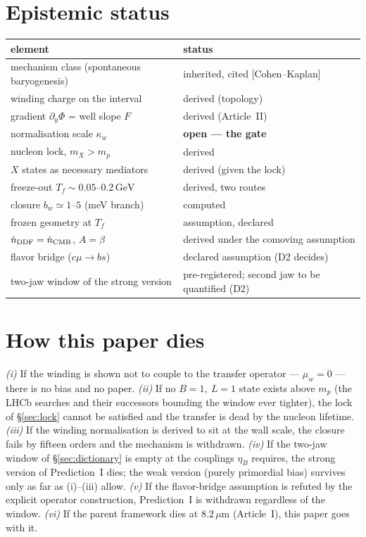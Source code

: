 \documentclass[11pt,a4paper]{article}
\newcommand{\GeV}{\,\mathrm{GeV}}
\begin{document}
\section{Epistemic status}
\label{sec:status}

\begin{center}\small
\begin{tabular}{p{7.2cm}p{6.4cm}}
\toprule
element & status \\
\midrule
mechanism class (spontaneous baryogenesis) & inherited, cited
[Cohen--Kaplan] \\
winding charge on the interval & derived (topology) \\
gradient $\partial_y\Phi$ = well slope $F$ & derived (Article~II) \\
normalisation scale $\kappa_w$ & \textbf{open --- the gate} \\
nucleon lock, $m_X>m_p$ & derived \\
$X$ states as necessary mediators & derived (given the lock) \\
freeze-out $T_f\sim0.05$--$0.2\GeV$ & derived, two routes \\
closure $b_w\simeq1$--$5$ (meV branch) & computed \\
frozen geometry at $T_f$ & assumption, declared \\
$\hat n_{\rm DDF}=\hat n_{\rm CMB}$, $A=\beta$ & derived under the comoving
assumption \\
flavor bridge ($c\mu\to bs$) & declared assumption (D2 decides) \\
two-jaw window of the strong version & pre-registered; second jaw to be
quantified (D2) \\
\bottomrule
\end{tabular}
\end{center}

\section{How this paper dies}
\label{sec:die}

\emph{(i)} If the winding is shown not to couple to the transfer operator ---
$\mu_w=0$ --- there is no bias and no paper.
\emph{(ii)} If no $B=1,\ L=1$ state exists above $m_p$ (the LHCb searches and
their successors bounding the window ever tighter), the lock of
\S\ref{sec:lock} cannot be satisfied and the transfer is dead by the nucleon
lifetime.
\emph{(iii)} If the winding normalisation is derived to sit at the wall scale,
the closure fails by fifteen orders and the mechanism is withdrawn.
\emph{(iv)} If the two-jaw window of \S\ref{sec:dictionary} is empty at the
couplings $\eta_B$ requires, the strong version of Prediction~I dies; the
weak version (purely primordial bias) survives only as far as (i)--(iii)
allow.
\emph{(v)} If the flavor-bridge assumption is refuted by the explicit operator
construction, Prediction~I is withdrawn regardless of the window.
\emph{(vi)} If the parent framework dies at $8.2\,\mu$m (Article~I), this
paper goes with it.
\end{document}
